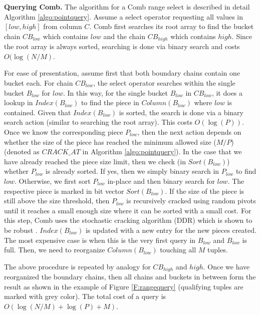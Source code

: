 \textbf{Querying Comb.}
The algorithm for a Comb range select is described in detail Algorithm \ref{algo:pointquery}.
Assume a select operator requesting all values in $[low,high]$ from column $C$.
Comb first searches its root array to find the bucket chain $CB_{low}$ 
which contains $low$ and the chain $CB_{high}$ which contains $high$.
Since the root array is always sorted, searching is done via binary search and costs $O(\log(N/M)$.

For ease of presentation, assume first that both boundary chains contain one bucket each. 
For chain $CB_{low}$, the select operator searches within the single bucket $B_{low}$ for $low$.
In this way, for the single bucket $B_{low}$ in $CB_{low}$,
it does a lookup in $Index(B_{low})$ to find the piece in $Column(B_{low})$ where $low$ is contained.
Given that $Index(B_{low})$ is sorted, the search is done via a binary search action 
(similar to searching the root array). This costs $O(\log(P))$.
Once we know the corresponding piece $P_{low}$, then the next action depends on whether 
the size of the piece has reached the minimum allowed size ($M/P$) (denoted as $CRACK\_AT$ in Algorithm \ref{algo:pointquery}).
In the case that we have already reached the piece size limit, then we check (in $Sort(B_{low})$) whether
$P_{low}$ is already sorted. If yes, then we simply binary search in $P_{low}$ to find $low$.
Otherwise, we first sort $P_{low}$ in-place and then binary search for $low$. 
The respective piece is marked in bit vector  $Sort(B_{low})$. 
If the size of the piece is still above the size threshold, 
then $P_{low}$ is recursively cracked using random pivots until it reaches a small enough size
where it can be sorted with a small cost.
For this step, Comb uses the stochastic cracking algorithm (DDR) which is shown to be robust \cite{StochasticCracking}.
$Index(B_{low})$ is updated with a new entry for the new pieces created.
The most expensive case is when this is the very first query in $B_{low}$ and $B_{low}$ is full. 
Then, we need to reorganize $Column(B_{low})$ touching all $M$ tuples.

The above procedure is repeated by analogy for $CB_{high}$ and $high$.
Once we have reorganized the boundary chains, then all chains and buckets in between form the result
as shown in the example of Figure \ref{F:rangequery} (qualifying tuples are marked with grey color).
The total cost of a query is $O(\log(N/M) + \log(P) + M)$.


